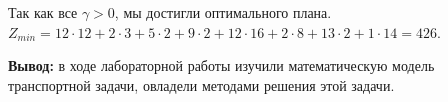 \documentclass[a4paper,14pt]{extarticle}
\begin{document}
Так как все $\gamma > 0$, мы достигли оптимального плана.\\

$Z_{min} = 12\cdot12 + 2\cdot 3 + 5\cdot2 + 9\cdot2 + 12\cdot16 + 2\cdot8 + 13\cdot2 + 1\cdot14 = 426$.

\textbf{Вывод: } в ходе лабораторной работы изучили математическую модель транспортной
задачи, овладели методами решения этой задачи.
\end{document}
